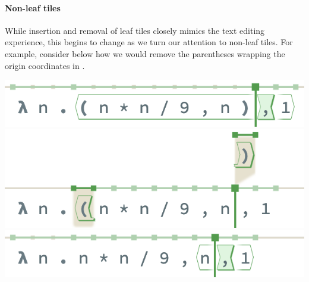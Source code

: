 
\paragraph{Non-leaf tiles}
While insertion and removal of leaf tiles closely mimics the
text editing experience, this begins to change as we turn our
attention to non-leaf tiles.
For example, consider below how we would remove the parentheses
wrapping the origin coordinates in \tylr.

\begin{center}
  \includegraphics[width=0.6\columnwidth]{img/remove-nonleaf-0.png}
  \includegraphics[width=0.6\columnwidth]{img/remove-nonleaf-1.png}
  \includegraphics[width=0.6\columnwidth]{img/remove-nonleaf-2.png}
\end{center}

